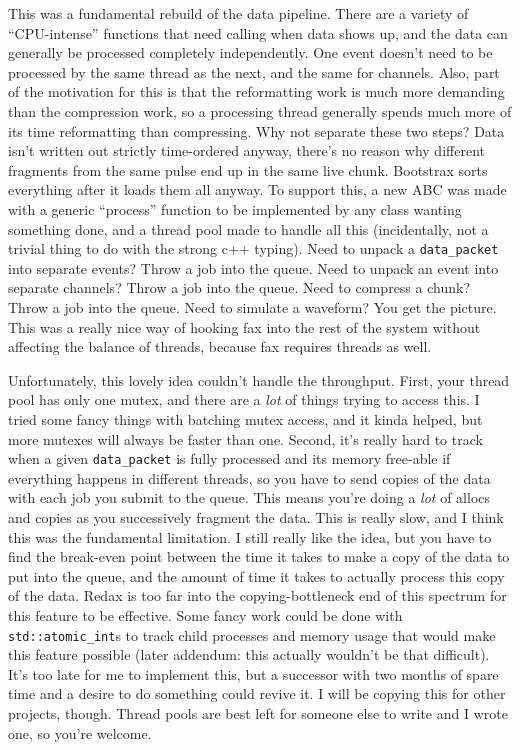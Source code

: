 This was a fundamental rebuild of the data pipeline.
There are a variety of ``CPU-intense'' functions that need calling when data shows up, and the data can generally be processed completely independently.
One event doesn't need to be processed by the same thread as the next, and the same for channels.
Also, part of the motivation for this is that the reformatting work is much more demanding than the compression work, so a processing thread generally spends much more of its time reformatting than compressing.
Why not separate these two steps?
Data isn't written out strictly time-ordered anyway, there's no reason why different fragments from the same pulse end up in the same live chunk.
Bootstrax sorts everything after it loads them all anyway.
To support this, a new ABC was made with a generic ``process'' function to be implemented by any class wanting something done, and a thread pool made to handle all this (incidentally, not a trivial thing to do with the strong c++ typing).
Need to unpack a \texttt{data\_packet} into separate events?
Throw a job into the queue.
Need to unpack an event into separate channels?
Throw a job into the queue.
Need to compress a chunk?
Throw a job into the queue.
Need to simulate a waveform?
You get the picture.
This was a really nice way of hooking fax into the rest of the system without affecting the balance of threads, because fax requires threads as well.

Unfortunately, this lovely idea couldn't handle the throughput.
First, your thread pool has only one mutex, and there are a \emph{lot} of things trying to access this.
I tried some fancy things with batching mutex access, and it kinda helped, but more mutexes will always be faster than one.
Second, it's really hard to track when a given \texttt{data\_packet} is fully processed and its memory free-able if everything happens in different threads, so you have to send copies of the data with each job you submit to the queue.
This means you're doing a \emph{lot} of allocs and copies as you successively fragment the data.
This is really slow, and I think this was the fundamental limitation.
I still really like the idea, but you have to find the break-even point between the time it takes to make a copy of the data to put into the queue, and the amount of time it takes to actually process this copy of the data.
Redax is too far into the copying-bottleneck end of this spectrum for this feature to be effective.
Some fancy work could be done with \texttt{std::atomic\_int}s to track child processes and memory usage that would make this feature possible (later addendum: this actually wouldn't be that difficult).
It's too late for me to implement this, but a successor with two months of spare time and a desire to do something could revive it.
I will be copying this for other projects, though.
Thread pools are best left for someone else to write and I wrote one, so you're welcome.

